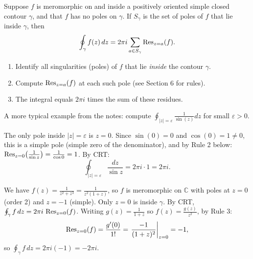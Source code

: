 \documentclass[11pt, a4paper]{article}
\begin{document}
\begin{thmbox}
Suppose $f$ is meromorphic on and inside a positively oriented simple closed contour $\gamma$, and that $f$ has no poles on $\gamma$. If $S_\gamma$ is the set of poles of $f$ that lie inside $\gamma$, then
\[
  \oint_\gamma f(z)\,dz = 2\pi i\sum_{a\in S_\gamma}\operatorname{Res}_{z=a}(f).
\]
\end{thmbox}

\begin{methodbox}
\begin{enumerate}
  \item Identify all singularities (poles) of $f$ that lie \emph{inside} the contour $\gamma$.
  \item Compute $\operatorname{Res}_{z=a}(f)$ at each such pole (see Section 6 for rules).
  \item The integral equals $2\pi i$ times the sum of these residues.
\end{enumerate}
\end{methodbox}

\begin{exbox}[Compute $\int_{|\gamma|=\varepsilon}\frac{z}{z^2+\sin(z)}dz$ (illustrative)]
A more typical example from the notes: compute $\oint_{|z|=\varepsilon}\frac{1}{\sin(z)}dz$ for small $\varepsilon>0$.

The only pole inside $|z|=\varepsilon$ is $z=0$. Since $\sin(0)=0$ and $\cos(0)=1\neq 0$, this is a simple pole (simple zero of the denominator), and by Rule 2 below: $\operatorname{Res}_{z=0}\!\left(\frac{1}{\sin z}\right)=\frac{1}{\cos 0}=1$. By CRT:
\[
  \oint_{|z|=\varepsilon}\frac{dz}{\sin z} = 2\pi i\cdot 1 = 2\pi i.
\]
\end{exbox}

\begin{exbox}
We have $f(z)=\frac{1}{z^2+z^3}=\frac{1}{z^2(1+z)}$, so $f$ is meromorphic on $\mathbb{C}$ with poles at $z=0$ (order 2) and $z=-1$ (simple). Only $z=0$ is inside $\gamma$. By CRT, $\oint_\gamma f\,dz=2\pi i\,\operatorname{Res}_{z=0}(f)$. Writing $g(z)=\frac{1}{1+z}$ so $f(z)=\frac{g(z)}{z^2}$, by Rule 3:
\[
  \operatorname{Res}_{z=0}(f) = \frac{g'(0)}{1!} = \left.\frac{-1}{(1+z)^2}\right|_{z=0} = -1,
\]
so $\oint_\gamma f\,dz = 2\pi i(-1) = -2\pi i$.
\end{exbox}

\newpage
\end{document}
